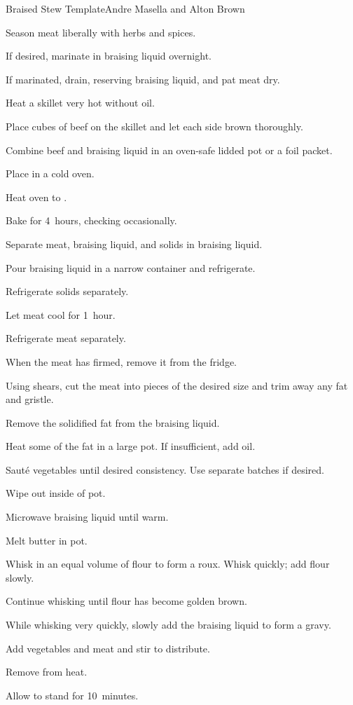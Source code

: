 \begin{recipe}{Braised Stew Template}{Andre Masella and Alton Brown}{}
\begin{directions}
\item Season meat liberally with herbs and spices.
\item If desired, marinate in braising liquid overnight.
\item If marinated, drain, reserving braising liquid, and pat meat dry.
\item Heat a skillet very hot without oil.
\item Place cubes of beef on the skillet and let each side brown thoroughly.
\item Combine beef and braising liquid in an oven-safe lidded pot or a foil packet.
\item Place in a cold oven.
\item Heat oven to .
\item Bake for 4~hours, checking occasionally.
\item Separate meat, braising liquid, and solids in braising liquid.
\item Pour braising liquid in a narrow container and refrigerate.
\item Refrigerate solids separately.
\item Let meat cool for 1~hour.
\item Refrigerate meat separately.
\item When the meat has firmed, remove it from the fridge.
\item Using shears, cut the meat into pieces of the desired size and trim away any fat and gristle.
\item Remove the solidified fat from the braising liquid.
\item Heat some of the fat in a large pot. If insufficient, add oil.
\item Sauté vegetables until desired consistency. Use separate batches if desired.
\item Wipe out inside of pot.
\item Microwave braising liquid until warm.
\item Melt butter in pot.
\item Whisk in an equal volume of flour to form a roux. Whisk quickly; add flour slowly.
\item Continue whisking until flour has become golden brown.
\item While whisking very quickly, slowly add the braising liquid to form a gravy.
\item Add vegetables and meat and stir to distribute.
\item Remove from heat.
\item Allow to stand for 10~minutes.
\end{directions}


\end{recipe}
